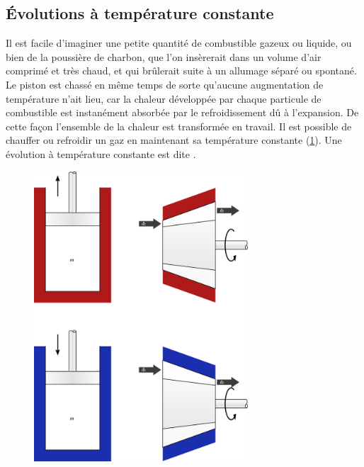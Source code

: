 	\subsection{Évolutions à température constante}
	\label{ch_gp_isothermes}
	
			Il est facile d’imaginer une petite quantité de combustible gazeux ou liquide, ou bien de la poussière de charbon, que l’on insèrerait dans un volume d’air comprimé et très chaud, et qui brûlerait suite à un allumage séparé ou spontané. Le piston est chassé en même temps de sorte qu’aucune augmentation de température n’ait lieu, car la chaleur développée par chaque particule de combustible est instanément absorbée par le refroidissement dû à l’expansion. De cette façon l’ensemble de la chaleur est transformée en travail.
		Il est possible de chauffer ou refroidir un gaz en maintenant sa température constante (\cref{fig_gp_température_constante}). Une évolution à température constante est dite .
		
		\begin{figure}
			\begin{center}
				\includegraphics[width=8cm]{images/temperature_constante.png}
			\end{center}
			\label{fig_gp_température_constante}
		\end{figure}
		
